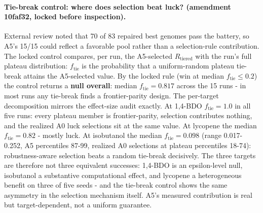 \documentclass[12pt,a4paper]{article}
\begin{document}
\paragraph{Tie-break control: where does selection beat luck? (amendment 10faf32, locked before inspection).} External review noted that 70 of 83 repaired best genomes pass the battery, so A5's 15/15 could reflect a favorable pool rather than a selection-rule contribution. The locked control compares, per run, the A5-selected $R_{\mathrm{tiered}}$ with the run's full plateau distribution: $f_{\mathrm{tie}}$ is the probability that a uniform-random plateau tie-break attains the A5-selected value. By the locked rule (win at median $f_{\mathrm{tie}} \le 0.2$) the control returns a \textbf{null overall}: median $f_{\mathrm{tie}} = 0.817$ across the 15 runs - in most runs any tie-break finds a frontier-parity design. The per-target decomposition mirrors the effect-size audit exactly. At 1,4-BDO $f_{\mathrm{tie}} = 1.0$ in all five runs: every plateau member is frontier-parity, selection contributes nothing, and the realized A0 luck selections sit at the same value. At lycopene the median $f_{\mathrm{tie}} = 0.82$ - mostly luck. At isobutanol the median $f_{\mathrm{tie}} = 0.098$ (range 0.017-0.252, A5 percentiles 87-99, realized A0 selections at plateau percentiles 18-74): robustness-aware selection beats a random tie-break decisively. The three targets are therefore not three equivalent successes: 1,4-BDO is an epsilon-level null, isobutanol a substantive computational effect, and lycopene a heterogeneous benefit on three of five seeds - and the tie-break control shows the same asymmetry in the selection mechanism itself. A5's measured contribution is real but target-dependent, not a uniform guarantee.
\end{document}
